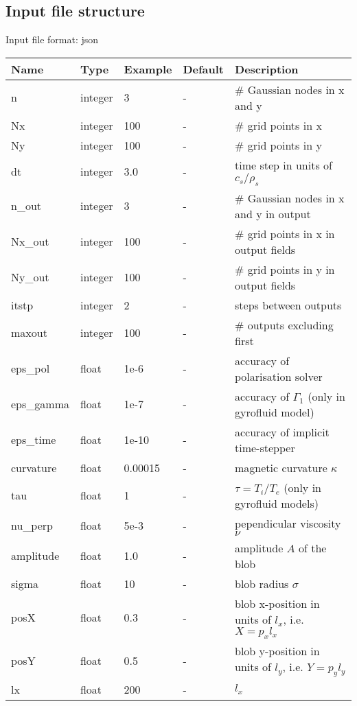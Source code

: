 \documentclass{hitec}
\begin{document}
\subsection{Input file structure}
Input file format: json

\begin{longtable}{llll>{\RaggedRight}p{7cm}}
\toprule
\rowcolor{gray!50}\textbf{Name} &  \textbf{Type} & \textbf{Example} & \textbf{Default} & \textbf{Description}  \\ \midrule
n      & integer & 3 & - &\# Gaussian nodes in x and y \\
Nx     & integer &100& - &\# grid points in x \\
Ny     & integer &100& - &\# grid points in y \\
dt     & integer &3.0& - &time step in units of $c_s/\rho_s$ \\
n\_out  & integer &3  & - &\# Gaussian nodes in x and y in output \\
Nx\_out & integer &100& - &\# grid points in x in output fields \\
Ny\_out & integer &100& - &\# grid points in y in output fields \\
itstp  & integer &2  & - &   steps between outputs \\
maxout & integer &100& - &      \# outputs excluding first \\
eps\_pol   & float &1e-6    & - &  accuracy of polarisation solver \\
eps\_gamma & float &1e-7    & - & accuracy of $\Gamma_1$ (only in gyrofluid model) \\
eps\_time  & float &1e-10   & - & accuracy of implicit time-stepper \\
curvature  & float &0.00015& - & magnetic curvature $\kappa$ \\
tau        & float &1      & - & $\tau = T_i/T_e$ (only in gyrofluid models) \\
nu\_perp    & float &5e-3   & - & pependicular viscosity $\nu$ \\
amplitude  & float &1.0    & - & amplitude $A$ of the blob \\
sigma      & float &10     & - & blob radius $\sigma$ \\
posX       & float &0.3    & - & blob x-position in units of $l_x$, i.e. $X = p_x l_x$\\
posY       & float &0.5    & - & blob y-position in units of $l_y$, i.e. $Y = p_y l_y$ \\
lx         & float &200    & - & $l_x$  \\

\end{longtable}
\end{document}
